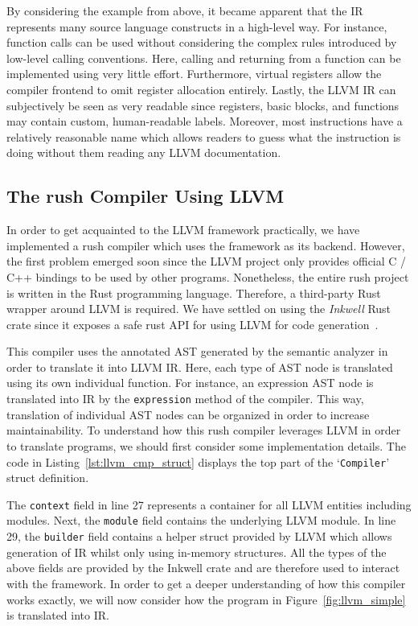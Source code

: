 By considering the example from above, it became apparent that the IR represents many source language constructs in a high-level way.
For instance, function calls can be used without considering the complex rules introduced by low-level calling conventions.
Here, calling and returning from a function can be implemented using very little effort.
Furthermore, virtual registers allow the compiler frontend to omit register allocation entirely.
Lastly, the LLVM IR can subjectively be seen as very readable since registers, basic blocks, and functions may contain custom, human-readable labels.
Moreover, most instructions have a relatively reasonable name which allows readers to guess what the instruction is doing without them reading any LLVM documentation.


\subsection{The rush Compiler Using LLVM}

In order to get acquainted to the LLVM framework practically, we have implemented a rush compiler which uses the framework as its backend.
However, the first problem emerged soon since the LLVM project only provides official C / C++ bindings to be used by other programs.
Nonetheless, the entire rush project is written in the Rust programming language.
Therefore, a third-party Rust wrapper around LLVM is required.
We have settled on using the \emph{Inkwell} Rust crate since it exposes a safe rust API for using LLVM for code generation~\cite{Inkwell2023}.

This compiler uses the annotated AST generated by the semantic analyzer in order to translate it into LLVM IR.
Here, each type of AST node is translated using its own individual function.
For instance, an expression AST node is translated into IR by the \texttt{expression} method of the compiler.
This way, translation of individual AST nodes can be organized in order to increase maintainability.
To understand how this rush compiler leverages LLVM in order to translate programs, we should first consider some implementation details.
The code in Listing~\ref{lst:llvm_cmp_struct} displays the top part of the `\texttt{Compiler}' struct definition.


The \texttt{context} field in line 27 represents a container for all LLVM entities including modules.
Next, the \texttt{module} field contains the underlying LLVM module.
In line 29, the \texttt{builder} field contains a helper struct provided by LLVM which allows generation of IR whilst only using in-memory structures.
All the types of the above fields are provided by the Inkwell crate and are therefore used to interact with the framework.
In order to get a deeper understanding of how this compiler works exactly, we will now consider how the program in Figure~\ref{fig:llvm_simple} is translated into IR.

